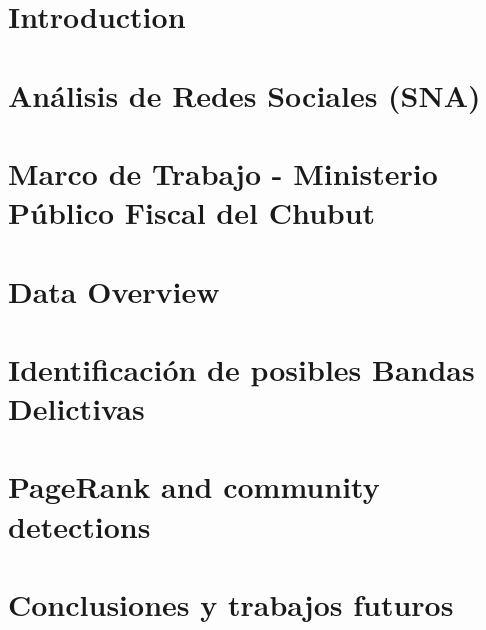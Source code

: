 \documentclass[runningheads]{llncs}
\begin{document}
%

\maketitle              %

%

%
\section{Introduction}


\section{Análisis de Redes Sociales (SNA)}


\section{Marco de Trabajo - Ministerio Público Fiscal del Chubut}


\section{Data Overview}


\section{Identificación de posibles Bandas Delictivas}


\section{PageRank and community detections}






\section{Conclusiones y trabajos futuros}



\end{document}

